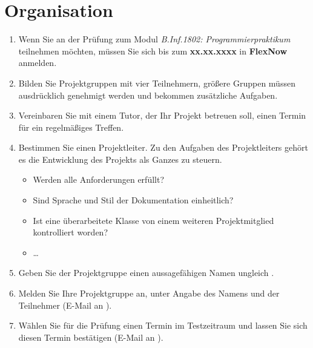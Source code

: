 \section*{Organisation}
\begin{enumerate}
\item Wenn Sie an der Prüfung zum Modul \emph{B.Inf.1802: Programmierpraktikum} teilnehmen möchten, müssen Sie sich bis zum \textbf{xx.xx.xxxx} in \textbf{FlexNow} anmelden.
\item Bilden Sie Projektgruppen mit vier Teilnehmern, größere Gruppen müssen ausdrücklich genehmigt werden und bekommen zusätzliche Aufgaben.

\item Vereinbaren Sie mit einem Tutor, der Ihr Projekt betreuen soll, einen Termin für ein regelmäßiges Treffen.
\item Bestimmen Sie einen Projektleiter. Zu den Aufgaben des Projektleiters gehört es die Entwicklung des Projekts als Ganzes zu steuern.
\begin{itemize}
\item Werden alle Anforderungen erfüllt?
\item Sind Sprache und Stil der Dokumentation einheitlich?
\item Ist eine überarbeitete Klasse von einem weiteren Projektmitglied kontrolliert worden?
\item \dots
\end{itemize}
\item Geben Sie der Projektgruppe einen aussagefähigen Namen ungleich .
\item Melden Sie Ihre Projektgruppe an, unter Angabe des Namens und der Teilnehmer 
(E-Mail an ).
\item Wählen Sie für die Prüfung einen Termin im Testzeitraum und lassen Sie sich diesen Termin bestätigen (E-Mail an ).
\end{enumerate}